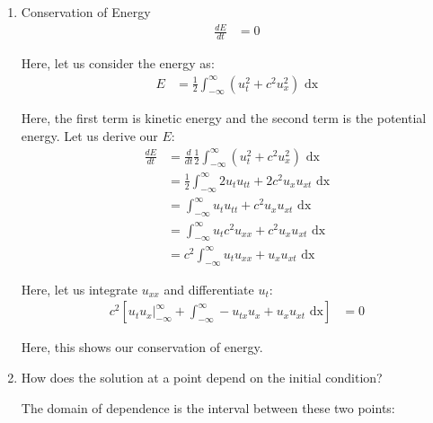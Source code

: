 \documentclass{article}
\begin{document}
\begin{enumerate}
  \item Conservation of Energy
  \begin{align}
    \frac{dE}{dt} & = 0
  \end{align}

  Here, let us consider the energy as:
  \begin{align}
    E & = \frac{1}{2} \int^\infty_{-\infty} (u^2_t + c^2 u^2_x) \text{ dx}
  \end{align}

  Here, the first term is kinetic energy and the second term is the potential energy. Let us derive our $E$:
  \begin{align}
    \frac{dE}{dt}
    & = \frac{d}{dt} \frac{1}{2} \int^\infty_{-\infty} (u^2_t + c^2 u^2_x) \text{ dx}\\
    & = \frac{1}{2} \int^\infty_{-\infty} 2u_t u_{tt} + 2 c^2 u_x u_{xt} \text{ dx}\\
    & = \int^\infty_{-\infty} u_t u_{tt} + c^2 u_x u_{xt} \text{ dx}\\
    & = \int^\infty_{-\infty} u_t c^2 u_{xx} + c^2 u_x u_{xt} \text{ dx}\\
    & = c^2 \int^\infty_{-\infty} u_t u_{xx} + u_x u_{xt} \text{ dx}
  \end{align}

  Here, let us integrate $u_{xx}$ and differentiate $u_t$:
  \begin{align}
    c^2
    \left[
     u_t u_x \Big|^\infty_{-\infty} + \int^\infty_{-\infty} - u_{tx} u_x + u_x u_{xt} \text{ dx}
    \right]
    & = 0
  \end{align}

  Here, this shows our conservation of energy.
  \item {}

  How does the solution at a point depend on the initial condition?

  The domain of dependence is the interval between these two points:
  \begin{align}
    [x_0 - ct_0, x_0 + ct_0]
  \end{align}
\end{enumerate}

\end{document}

